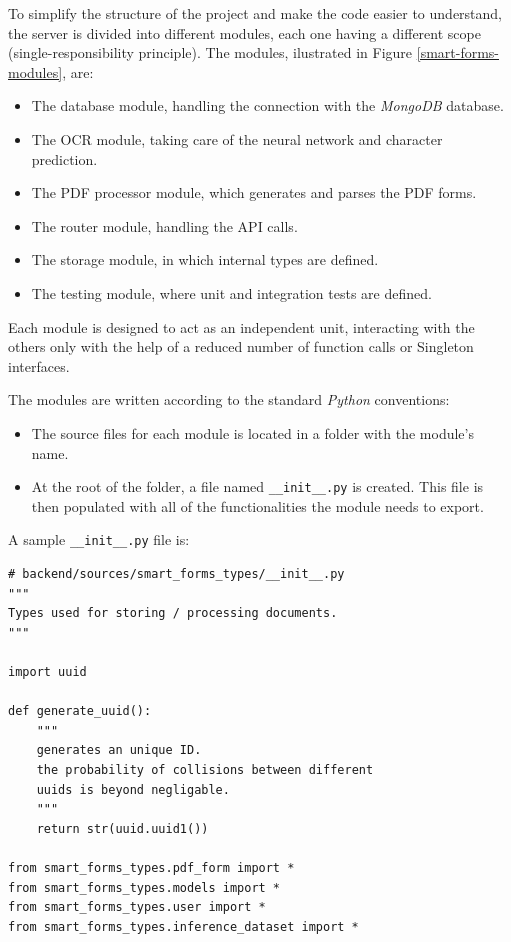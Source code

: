 \documentclass[11pt, a4paper]{report}
\def\code#1{\texttt{#1}}
\begin{document}
To simplify the structure of the project and make the code easier to understand, the server is divided into different modules, each one having a different scope (single-responsibility principle). The modules, ilustrated in Figure \ref{smart-forms-modules}, are:
\begin{itemize}
    \item The database module, handling the connection with the \textit{MongoDB} database.
    \item The OCR module, taking care of the neural network and character prediction.
    \item The PDF processor module, which generates and parses the PDF forms.
    \item The router module, handling the API calls.
    \item The storage module, in which internal types are defined.
    \item The testing module, where unit and integration tests are defined.
\end{itemize}


Each module is designed to act as an independent unit, interacting with the others only with the help of a reduced number of function calls or Singleton interfaces.

The modules are written according to the standard \textit{Python} conventions:
\begin{itemize}
    \item The source files for each module is located in a folder with the module's name.
    \item At the root of the folder, a file named \code{\_\_init\_\_.py} is created. This file is then populated with all of the functionalities the module needs to export.
\end{itemize}

A sample \code{\_\_init\_\_.py} file is:

\begin{verbatim}
# backend/sources/smart_forms_types/__init__.py
"""
Types used for storing / processing documents.
"""

import uuid

def generate_uuid():
    """
    generates an unique ID.
    the probability of collisions between different
    uuids is beyond negligable.
    """
    return str(uuid.uuid1())

from smart_forms_types.pdf_form import *
from smart_forms_types.models import *
from smart_forms_types.user import *
from smart_forms_types.inference_dataset import *
\end{verbatim}
\end{document}
